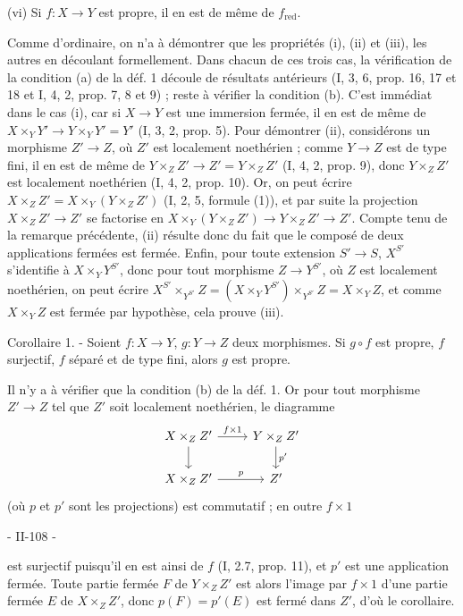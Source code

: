 (vi) Si $f : X \to Y$ est propre, il en est de même de $f_{\text{red}}$.

Comme d'ordinaire, on n'a à démontrer que les propriétés (i), (ii) et (iii), les autres en découlant formellement. Dans chacun de ces trois cas, la vérification de la condition (a) de la déf. 1 découle de résultats antérieurs (I, 3, 6, prop. 16, 17 et 18 et I, 4, 2, prop. 7, 8 et 9) ; reste à vérifier la condition (b). C'est immédiat dans le cas (i), car si $X \to Y$ est une immersion fermée, il en est de même de $X \times_Y Y' \to Y \times_Y Y' = Y'$ (I, 3, 2, prop. 5). Pour démontrer (ii), considérons un morphisme $Z' \to Z$, où $Z'$ est localement noethérien ; comme $Y \to Z$ est de type fini, il en est de même de $Y \times_Z Z' \to Z' = Y \times_Z Z'$ (I, 4, 2, prop. 9), donc $Y \times_Z Z'$ est localement noethérien (I, 4, 2, prop. 10). Or, on peut écrire $X \times_Z Z' = X \times_Y (Y \times_Z Z')$ (I, 2, 5, formule (1)), et par suite la projection $X \times_Z Z' \to Z'$ se factorise en $X \times_Y (Y \times_Z Z') \to Y \times_Z Z' \to Z'$. Compte tenu de la remarque précédente, (ii) résulte donc du fait que le composé de deux applications fermées est fermée. Enfin, pour toute extension $S' \to S$, $X^{S'}$ s'identifie à $X \times_Y Y^{S'}$, donc pour tout morphisme $Z \to Y^{S'}$, où $Z$ est localement noethérien, on peut écrire $X^{S'} \times_{Y^{S'}} Z = (X \times_Y Y^{S'}) \times_{Y^{S'}} Z = X \times_Y Z$, et comme $X \times_Y Z$ est fermée par hypothèse, cela prouve (iii).

Corollaire 1. - Soient $f : X \to Y$, $g : Y \to Z$ deux morphismes. Si $g \circ f$ est propre, $f$ surjectif, $f$ séparé et de type fini, alors $g$ est propre.

Il n'y a à vérifier que la condition (b) de la déf. 1. Or pour tout morphisme $Z' \to Z$ tel que $Z'$ soit localement noethérien, le diagramme
$$\begin{tikzcd}
X \times_Z Z' \arrow[r, "f \times 1"] \arrow[d] & Y \times_Z Z' \arrow[d, "p'"] \\
X \times_Z Z' \arrow[r, "p"] & Z'
\end{tikzcd}$$
(où $p$ et $p'$ sont les projections) est commutatif ; en outre $f \times 1$

\newpage


- II-108 -

est surjectif puisqu'il en est ainsi de $f$ (I, 2.7, prop. 11), et $p'$ est une application fermée. Toute partie fermée $F$ de $Y \times_Z Z'$ est alors l'image par $f \times 1$ d'une partie fermée $E$ de $X \times_Z Z'$, donc $p(F) = p'(E)$ est fermé dans $Z'$, d'où le corollaire.

